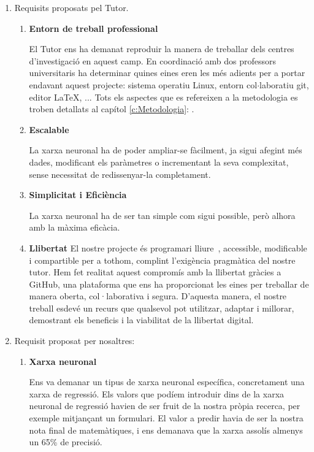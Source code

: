 \begin{enumerate}
 \item Requisits proposats pel Tutor.
    \begin{enumerate}
        \item \textbf{Entorn de treball professional}

        El Tutor ens ha demanat reproduir la manera de treballar dels centres d'investigació en aquest camp. En coordinació amb dos professors universitaris ha determinar quines eines eren les més adients per a portar endavant aquest projecte: sistema operatiu Linux, entorn col$\cdot$laboratiu git, editor LaTeX, ... Tots els aspectes que es refereixen a la metodologia es troben detallats al capítol \ref{c:Metodologia}: .

        \item \textbf{Escalable}

        La xarxa neuronal ha de poder ampliar-se fàcilment, ja sigui afegint més dades, modificant els paràmetres o incrementant la seva complexitat, sense necessitat de redissenyar-la completament.

        \item \textbf{Simplicitat i Eficiència}

        La xarxa neuronal ha de ser tan simple com sigui possible, però alhora amb la màxima eficàcia.

        \item \textbf{Llibertat}
        El nostre projecte és programari lliure~\cite{ProgramariLliure}, accessible, modificable i compartible per a tothom, complint l'exigència pragmàtica del nostre tutor. Hem fet realitat aquest compromís amb la llibertat gràcies a GitHub\cite{GitHub}, una plataforma que ens ha proporcionat les eines per treballar de manera oberta, col·laborativa i segura. D’aquesta manera, el nostre treball esdevé un recurs que qualsevol pot utilitzar, adaptar i millorar, demostrant els beneficis i la viabilitat de la llibertat digital.

    \end{enumerate}

 \item Requisit proposat per nosaltres:
    \begin{enumerate}
        \item \textbf{Xarxa neuronal}

        Ens va demanar un tipus de xarxa neuronal específica, concretament una xarxa de regressió. Els valors que podíem introduir dins de la xarxa neuronal de regressió havien de ser fruit de la nostra pròpia recerca, per exemple mitjançant un formulari. El valor a predir havia de ser la nostra nota final de matemàtiques, i ens demanava que la xarxa assolís almenys un 65\% de precisió.


\end{enumerate}
\end{enumerate}
